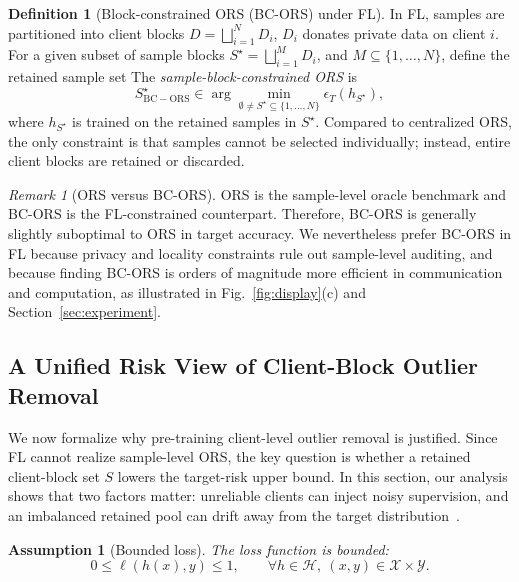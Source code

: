 ﻿\documentclass[conference]{IEEEtran}
\newtheorem{assumption}{Assumption}
\theoremstyle{definition}
\newtheorem{definition}{Definition}
\theoremstyle{remark}
\newtheorem{remark}{Remark}
\begin{document}
\begin{definition}[Block-constrained ORS (BC-ORS) under FL]
	\label{def:sample_block_constrained}
	In FL, samples are partitioned into client blocks $D=\bigsqcup_{i=1}^N D_i$, $D_i$ donates private data on client $i$.
	For a given subset of sample blocks $S^\star=\bigsqcup_{i=1}^M D_i$, and $M\subseteq\{1,\dots,N\}$, define the retained sample set The \emph{sample-block-constrained ORS} is
	\begin{equation}
		S^\star_{\mathrm{BC-ORS}} \in \arg\min_{\emptyset\neq S^\star \subseteq \{1,\dots,N\}} \epsilon_T(h_{S^\star}),
	\end{equation}
	where $h_{S^\star}$ is trained on the retained samples in $S^\star$. 
	Compared to centralized ORS, the only constraint is that samples cannot be selected individually; instead, entire client blocks are retained or discarded.
\end{definition}

\begin{remark}[ORS versus BC-ORS]
\label{rem:ORS_vs_BC-ORS}
ORS is the sample-level oracle benchmark and BC-ORS is the FL-constrained counterpart. Therefore, BC-ORS is generally slightly suboptimal to ORS in target accuracy. We nevertheless prefer BC-ORS in FL because privacy and locality constraints rule out sample-level auditing, and because finding BC-ORS is orders of magnitude more efficient in communication and computation, as illustrated in Fig.~\ref{fig:display}(c) and Section~\ref{sec:experiment}.
\end{remark}

\subsection{A Unified Risk View of Client-Block Outlier Removal}
\label{subsec:risk_view}

We now formalize why pre-training client-level outlier removal is justified.
Since FL cannot realize sample-level ORS, the key question is whether a retained client-block set $S$ lowers the target-risk upper bound.
In this section, our analysis shows that two factors matter: unreliable clients can inject noisy supervision, and an imbalanced retained pool can drift away from the target distribution~\cite{hsu2019measuring,li2021silos,zhu2021survey}.

\begin{assumption}[Bounded loss]
\label{assump:bounded_loss}
The loss function is bounded:
\begin{equation}
0\le \ell(h(x),y)\le 1,
\qquad
\forall h\in\mathcal{H},\ (x,y)\in\mathcal{X}\times\mathcal{Y}.
\end{equation}
\end{assumption}
\end{document}
